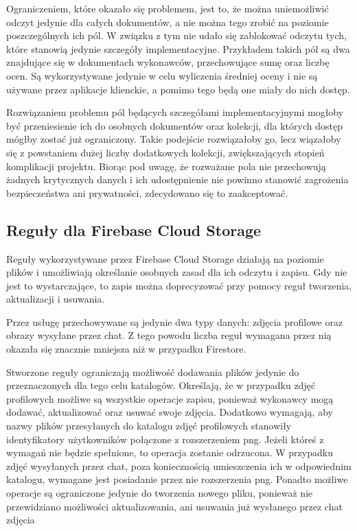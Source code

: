 Ograniczeniem, które okazało się problemem, jest to, że można uniemożliwić odczyt jedynie dla całych dokumentów, a nie można tego zrobić na poziomie poszczególnych ich pól. W związku z tym nie udało się zablokować odczytu tych, które stanowią jedynie szczegóły implementacyjne. Przykładem takich pól są dwa znajdujące się w dokumentach wykonawców, przechowujące sumę oraz liczbę ocen. Są wykorzystywane jedynie w celu wyliczenia średniej oceny i nie są używane przez aplikacje klienckie, a pomimo tego będą one miały do nich dostęp.

Rozwiązaniem problemu pól będących szczegółami implementacyjnymi mogłoby być przeniesienie ich do osobnych dokumentów oraz kolekcji, dla których dostęp mógłby zostać już ograniczony. Takie podejście rozwiązałoby go, lecz wiązałoby się z powstaniem dużej liczby dodatkowych kolekcji, zwiększających stopień komplikacji projektu. Biorąc pod uwagę, że rozważane pola nie przechowują żadnych krytycznych danych i ich udostępnienie nie powinno stanowić zagrożenia bezpieczeństwa ani prywatności, zdecydowano się to zaakceptować.

\subsection{Reguły dla Firebase Cloud Storage}

Reguły wykorzystywane przez Firebase Cloud Storage działają na poziomie plików i umożliwiają określanie osobnych zasad dla ich odczytu i zapisu. Gdy nie jest to wystarczające, to zapis można doprecyzować przy pomocy reguł tworzenia, aktualizacji i usuwania.

Przez usługę przechowywane są jedynie dwa typy danych: zdjęcia profilowe oraz obrazy wysyłane przez chat. Z tego powodu liczba reguł wymagana przez nią okazała się znacznie mniejsza niż w przypadku Firestore. 

Stworzone reguły ograniczają możliwość dodawania plików jedynie do przeznaczonych dla tego celu katalogów. Określają, że w przypadku zdjęć profilowych możliwe są wszystkie operacje zapisu, ponieważ wykonawcy mogą dodawać, aktualizować oraz usuwać swoje zdjęcia. Dodatkowo wymagają, aby nazwy plików przesyłanych do katalogu zdjęć profilowych stanowiły identyfikatory użytkowników połączone z rozszerzeniem png. Jeżeli któreś z wymagań nie będzie spełnione, to operacja zostanie odrzucona.
W przypadku zdjęć wysyłanych przez chat, poza koniecznością umieszczenia ich w odpowiednim katalogu, wymagane jest posiadanie przez nie rozszerzenia png. Ponadto możliwe operacje są ograniczone jedynie do tworzenia nowego pliku, ponieważ nie przewidziano możliwości aktualizowania, ani usuwania już wysłanego przez chat zdjęcia
